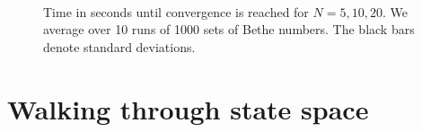 \documentclass[11pt, a4paper]{report} %
\begin{document}
\begin{figure}[H]
  \centering
  \\
  \\
  \\
  \caption{Time in seconds until convergence is reached for \(N=5,10,20\). We average over 10 runs of 1000 sets of Bethe numbers. The black bars denote standard deviations.}
  \label{fig:convtimes}
\end{figure}

\section{Walking through state space}
\end{document}
